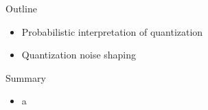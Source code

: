 \documentclass[10pt]{beamer}
\begin{document}
%
\begin{frame}{Outline}
	\begin{itemize}
		\item Probabilistic interpretation of quantization
		\item Quantization noise shaping
	\end{itemize}
\end{frame}


%
\begin{frame}{Summary}
\begin{itemize}
	\item a
\end{itemize}
\end{frame}
\end{document}
